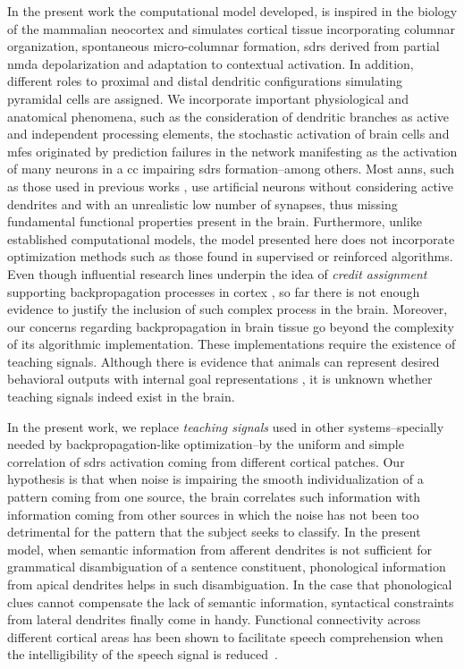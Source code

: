 {In the present work the computational model developed, is inspired in the biology of the mammalian neocortex and simulates cortical tissue incorporating columnar organization, spontaneous micro-columnar formation, \glspl{sdr} derived from partial \gls{nmda} depolarization and adaptation to contextual activation. In addition, different roles to proximal and distal dendritic configurations simulating pyramidal cells are assigned. We incorporate important physiological and anatomical phenomena, such as the consideration of dendritic branches as active and independent processing elements, the stochastic activation of brain cells and \glspl{mfe} originated by prediction failures in the network manifesting as the activation of many neurons in a \gls{cc} impairing \glspl{sdr} formation--among others. Most \glspl{ann}, such as those used in previous works \cite{STJOHN1990217, rabovsky_modelling_2018, Dominey2009NeuralNP, michalon_meaning-driven_2019}, use artificial neurons without considering active dendrites and with an unrealistic low number of synapses, thus missing fundamental functional properties present in the brain. Furthermore, unlike established computational models, the model presented here does not incorporate optimization methods such as those found in supervised or reinforced algorithms. Even though influential research lines underpin the idea of \emph{credit assignment} supporting backpropagation processes in cortex \cite{10.7554/eLife.22901}, so far there is not enough evidence to justify the inclusion of such complex process in the brain. Moreover, our concerns regarding backpropagation in brain tissue go beyond the complexity of its algorithmic implementation. These implementations require the existence of teaching signals. Although there is evidence that animals can represent desired behavioral outputs with internal goal representations \cite{gadagkar_dopamine_2016}, it is unknown whether teaching signals indeed exist in the brain.

In the present work, we replace \emph{teaching signals} used in other systems--specially needed by backpropagation-like optimization--by the uniform and simple correlation of \glspl{sdr} activation coming from different cortical patches. Our hypothesis is that when noise is impairing the smooth individualization of a pattern coming from one source, the brain correlates such information with information coming from other sources in which the noise has not been too detrimental for the pattern that the subject seeks to classify. In the present model, when semantic information from afferent dendrites is not sufficient for grammatical disambiguation of a sentence constituent, phonological information from apical dendrites helps in such disambiguation. In the case that phonological clues cannot compensate the lack of semantic information, syntactical constraints from lateral dendrites finally come in handy. Functional connectivity across different cortical areas has been shown to facilitate speech comprehension when the intelligibility of the speech signal is reduced~\cite{Obleser2283}.

}
